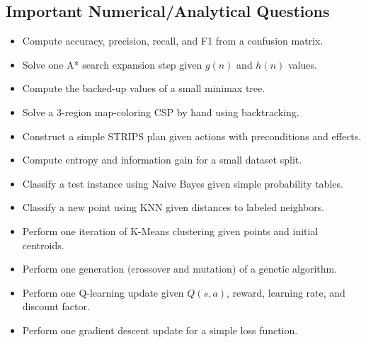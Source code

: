 \documentclass[11pt,a4paper]{article}
\begin{document}
\subsection{Important Numerical/Analytical Questions}
\begin{itemize}[leftmargin=*]
  \item Compute accuracy, precision, recall, and F1 from a confusion matrix.
  \item Solve one A* search expansion step given $g(n)$ and $h(n)$ values.
  \item Compute the backed-up values of a small minimax tree.
  \item Solve a 3-region map-coloring CSP by hand using backtracking.
  \item Construct a simple STRIPS plan given actions with preconditions and effects.
  \item Compute entropy and information gain for a small dataset split.
  \item Classify a test instance using Naive Bayes given simple probability tables.
  \item Classify a new point using KNN given distances to labeled neighbors.
  \item Perform one iteration of K-Means clustering given points and initial centroids.
  \item Perform one generation (crossover and mutation) of a genetic algorithm.
  \item Perform one Q-learning update given $Q(s,a)$, reward, learning rate, and discount factor.
  \item Perform one gradient descent update for a simple loss function.
\end{itemize}
\end{document}
